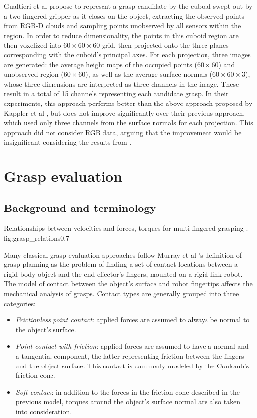 Gualtieri et al \cite{Gualtieri2016} propose to represent a grasp candidate by the cuboid swept out by a two-fingered
gripper as it closes on the object, extracting the observed points from RGB-D clouds and sampling points unobserved by
all sensors within the region. In order to reduce dimensionality, the points in this cuboid region are then voxelized
into $60 \times 60 \times 60$ grid, then projected onto the three planes corresponding with the cuboid's principal axes.
For each projection, three images are generated: the average height maps of the occupied points ($60 \times 60$) and
unobserved region ($60 \times 60$), as well as the average surface normals ($60 \times 60 \times 3$), whose three
dimensions are interpreted as three channels in the image. These result in a total of 15 channels representing each
candidate grasp. In their experiments, this approach performs better than the above approach proposed by Kappler et al
\cite{Kappler2015}, but does not improve significantly over their previous approach, which used only three channels from
the surface normals for each projection. This approach did not consider RGB data, arguing that the improvement would be
insignificant considering the results from \cite{lenz2015}.


\section{Grasp evaluation} \label{section:grasp_eval}

\subsection{Background and terminology}
             {Relationships between velocities and forces, torques for multi-fingered grasping \cite{Roa2015}.}
             {fig:grasp_relations}{0.7\textwidth}

Many classical grasp evaluation approaches follow Murray et al \cite{Murray1994}'s definition of grasp planning as the
problem of finding a set of contact locations between a rigid-body object and the end-effector's fingers, mounted on a
rigid-link robot. The model of contact between the object's surface and robot fingertips affects the mechanical analysis
of grasps. Contact types are generally grouped into three categories:
\begin{itemize}
    \item \emph{Frictionless point contact}: applied forces are assumed to always be normal to the object's surface.
    \item \emph{Point contact with friction}: applied forces are assumed to have a normal and a tangential component,
    the latter representing friction between the fingers and the object surface. This contact is commonly modeled by the
    Coulomb's friction cone.
    \item \emph{Soft contact}: in addition to the forces in the friction cone described in the previous model, torques
    around the object's surface normal are also taken into consideration.
\end{itemize}

